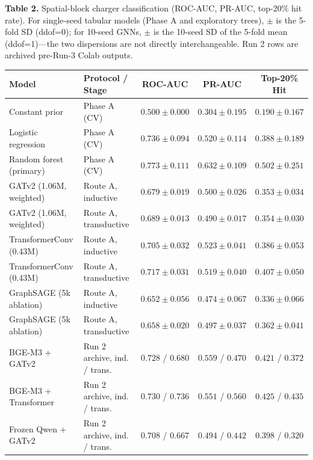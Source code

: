 \documentclass[11pt,a4paper]{article}
\begin{document}
\begin{table}[htbp]
\centering
{\footnotesize\singlespacing
\renewcommand{\arraystretch}{0.95}
\textbf{Table 2.} Spatial-block charger classification (ROC-AUC, PR-AUC, top-20\% hit rate). For single-seed tabular models (Phase A and exploratory trees), \(\pm\) is the 5-fold SD (ddof=0); for 10-seed GNNs, \(\pm\) is the 10-seed SD of the 5-fold mean (ddof=1)—the two dispersions are not directly interchangeable. Run 2 rows are archived pre-Run-3 Colab outputs.
\par\vspace{0.3em}
\setlength{\tabcolsep}{4.5pt}
\begin{tabular}{llccc}
\toprule
Model & Protocol / Stage & ROC-AUC & PR-AUC & Top-20\% Hit \\
\midrule
Constant prior & Phase A (CV) & \(0.500 \pm 0.000\) & \(0.304 \pm 0.195\) & \(0.190 \pm 0.167\) \\
Logistic regression & Phase A (CV) & \(0.736 \pm 0.094\) & \(0.520 \pm 0.114\) & \(0.388 \pm 0.189\) \\
Random forest (primary) & Phase A (CV) & \(0.773 \pm 0.111\) & \(0.632 \pm 0.109\) & \(0.502 \pm 0.251\) \\
\midrule
GATv2 (1.06M, weighted) & Route A, inductive & \(0.679 \pm 0.019\) & \(0.500 \pm 0.026\) & \(0.353 \pm 0.034\) \\
GATv2 (1.06M, weighted) & Route A, transductive & \(0.689 \pm 0.013\) & \(0.490 \pm 0.017\) & \(0.354 \pm 0.030\) \\
TransformerConv (0.43M) & Route A, inductive & \(0.705 \pm 0.032\) & \(0.523 \pm 0.041\) & \(0.386 \pm 0.053\) \\
TransformerConv (0.43M) & Route A, transductive & \(0.717 \pm 0.031\) & \(0.519 \pm 0.040\) & \(0.407 \pm 0.050\) \\
GraphSAGE (5k ablation) & Route A, inductive & \(0.652 \pm 0.056\) & \(0.474 \pm 0.067\) & \(0.336 \pm 0.066\) \\
GraphSAGE (5k ablation) & Route A, transductive & \(0.658 \pm 0.020\) & \(0.497 \pm 0.037\) & \(0.362 \pm 0.041\) \\
\midrule
BGE-M3 + GATv2 & Run 2 archive, ind. / trans. & \(0.728\) / \(0.680\) & \(0.559\) / \(0.470\) & \(0.421\) / \(0.372\) \\
BGE-M3 + Transformer & Run 2 archive, ind. / trans. & \(0.730\) / \(0.736\) & \(0.551\) / \(0.560\) & \(0.425\) / \(0.435\) \\
Frozen Qwen + GATv2 & Run 2 archive, ind. / trans. & \(0.708\) / \(0.667\) & \(0.494\) / \(0.442\) & \(0.398\) / \(0.320\) \\

\end{tabular}}
\end{table}
\end{document}
